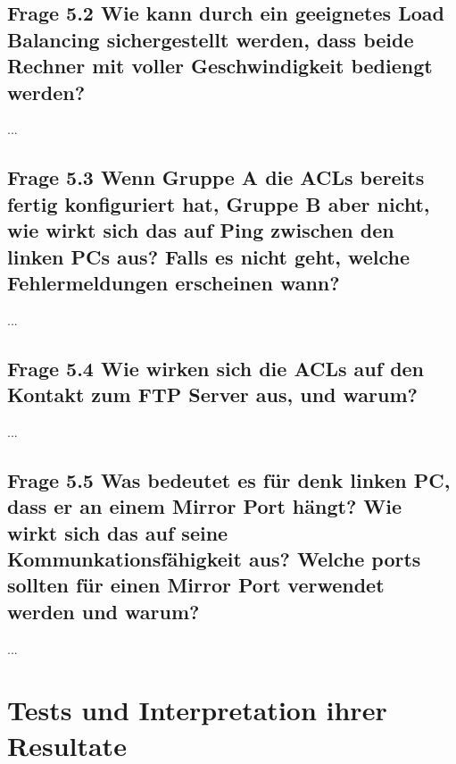 \documentclass{article}
\begin{document}
\subsection*{Frage 5.2 \normalfont Wie kann durch ein geeignetes Load Balancing sichergestellt werden, dass beide Rechner mit voller Geschwindigkeit bediengt werden?}
...\\

\subsection*{Frage 5.3 \normalfont Wenn Gruppe A die ACLs bereits fertig konfiguriert hat, Gruppe B aber nicht, wie wirkt sich das auf Ping zwischen den linken PCs aus? Falls es nicht geht, welche Fehlermeldungen erscheinen wann?}
...\\

\subsection*{Frage 5.4 \normalfont Wie wirken sich die ACLs auf den Kontakt zum FTP Server aus, und warum?} 
...\\

\subsection*{Frage 5.5 \normalfont Was bedeutet es für denk linken PC, dass er an einem Mirror Port hängt? Wie wirkt sich das auf seine Kommunkationsfähigkeit aus? Welche ports sollten für einen Mirror Port verwendet werden und warum?}
...\\

\pagebreak
\section{Tests und Interpretation ihrer Resultate}
\end{document}
